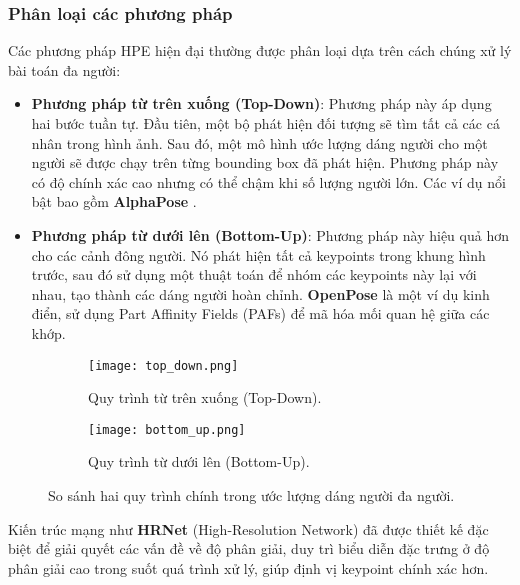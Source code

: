 \subsubsection{Phân loại các phương pháp}
Các phương pháp HPE hiện đại thường được phân loại dựa trên cách chúng xử lý bài toán đa người:
\begin{itemize}
    \item \textbf{Phương pháp từ trên xuống (Top-Down)}: Phương pháp này áp dụng hai bước tuần tự. Đầu tiên, một bộ phát hiện đối tượng sẽ tìm tất cả các cá nhân trong hình ảnh. Sau đó, một mô hình ước lượng dáng người cho một người sẽ được chạy trên từng bounding box đã phát hiện. Phương pháp này có độ chính xác cao nhưng có thể chậm khi số lượng người lớn. Các ví dụ nổi bật bao gồm \textbf{AlphaPose} \cite{fang2017rmpe}.
    \item \textbf{Phương pháp từ dưới lên (Bottom-Up)}: Phương pháp này hiệu quả hơn cho các cảnh đông người. Nó phát hiện tất cả keypoints trong khung hình trước, sau đó sử dụng một thuật toán để nhóm các keypoints này lại với nhau, tạo thành các dáng người hoàn chỉnh. \textbf{OpenPose} \cite{cao2017realtime} là một ví dụ kinh điển, sử dụng Part Affinity Fields (PAFs) để mã hóa mối quan hệ giữa các khớp.
\end{itemize}
\begin{figure}[h]
    \centering
    \begin{subfigure}[b]{0.45\textwidth}
        \texttt{[image: top\_down.png]}
        \caption{Quy trình từ trên xuống (Top-Down).}
    \end{subfigure}
    \hfill
    \begin{subfigure}[b]{0.45\textwidth}
        \texttt{[image: bottom\_up.png]}
        \caption{Quy trình từ dưới lên (Bottom-Up).}
    \end{subfigure}
    \caption{So sánh hai quy trình chính trong ước lượng dáng người đa người.}
\end{figure}
Kiến trúc mạng như \textbf{HRNet} (High-Resolution Network) \cite{sun2019deep} đã được thiết kế đặc biệt để giải quyết các vấn đề về độ phân giải, duy trì biểu diễn đặc trưng ở độ phân giải cao trong suốt quá trình xử lý, giúp định vị keypoint chính xác hơn.

